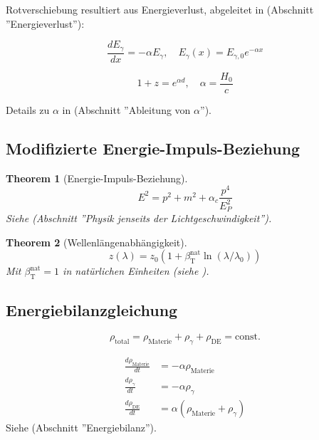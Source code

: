 \documentclass[a4paper,12pt]{article}
\newtheorem{theorem}{Theorem}[section]
\theoremstyle{definition}
\theoremstyle{remark}
\newcommand{\betaT}{\beta_{\text{T}}}
\begin{document}
	Rotverschiebung resultiert aus Energieverlust, abgeleitet in \cite{pascher_messdifferenzen_2025} (Abschnitt ''Energieverlust''):
	
	\begin{equation}
		\frac{d E_{\gamma}}{d x} = -\alpha E_{\gamma}, \quad E_{\gamma}(x) = E_{\gamma,0} e^{-\alpha x}
	\end{equation}
	
	\begin{equation}
		1 + z = e^{\alpha d}, \quad \alpha = \frac{H_0}{c}
	\end{equation}
	
	Details zu \(\alpha\) in \cite{pascher_params_2025} (Abschnitt ''Ableitung von \(\alpha\)'').
	
	\subsection{Modifizierte Energie-Impuls-Beziehung}
	
	\begin{theorem}[Energie-Impuls-Beziehung]
		\begin{equation}
			E^2 = p^2 + m^2 + \alpha_c \frac{p^4}{E_P^2}
		\end{equation}
		Siehe \cite{pascher_photons_2025} (Abschnitt ''Physik jenseits der Lichtgeschwindigkeit'').
	\end{theorem}
	
	\begin{theorem}[Wellenlängenabhängigkeit]
		\begin{equation}
			z(\lambda) = z_0 (1 + \betaT^{\text{nat}} \ln(\lambda/\lambda_0))
		\end{equation}
		Mit \(\betaT^{\text{nat}} = 1\) in natürlichen Einheiten (siehe \cite{pascher_params_2025}).
	\end{theorem}
	
	\subsection{Energiebilanzgleichung}
	
	\begin{equation}
		\rho_{\text{total}} = \rho_{\text{Materie}} + \rho_{\gamma} + \rho_{\text{DE}} = \text{const.}
	\end{equation}
	
	\begin{align}
		\frac{d \rho_{\text{Materie}}}{d t} &= -\alpha \rho_{\text{Materie}} \\
		\frac{d \rho_{\gamma}}{d t} &= -\alpha \rho_{\gamma} \\
		\frac{d \rho_{\text{DE}}}{d t} &= \alpha (\rho_{\text{Materie}} + \rho_{\gamma})
	\end{align}
	Siehe \cite{pascher_messdifferenzen_2025} (Abschnitt ''Energiebilanz'').
	
\end{document}
